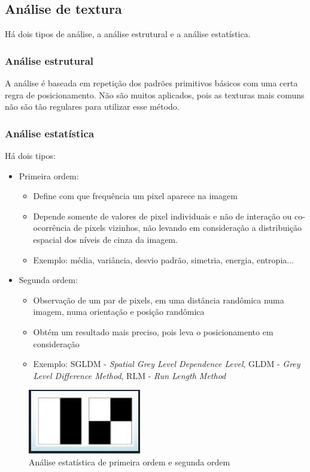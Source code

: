 \documentclass{article}
\begin{document}
\subsection{Análise de textura}
Há dois tipos de análise, a análise estrutural e a análise estatística.

\subsubsection{Análise estrutural}
A análise é baseada em repetição dos padrões primitivos básicos com uma certa regra de posicionamento.
Não são muitos aplicados, pois as texturas mais comuns não são tão regulares para utilizar esse método.

\subsubsection{Análise estatística}
Há dois tipos:
\begin{itemize}
    \item Primeira ordem:
    \begin{itemize}
        \item Define com que frequência um pixel aparece na imagem
        \item Depende somente de valores de pixel individuais e não de interação ou co-ocorrência de pixels vizinhos, não levando em consideração a distribuição espacial dos níveis de cinza da imagem.
        \item Exemplo: média, variância, desvio padrão, simetria, energia, entropia...
    \end{itemize}
    \item Segunda ordem:
    \begin{itemize}
        \item Observação de um par de pixels, em uma distância randômica numa imagem, numa orientação e posição randômica
        \item Obtém um resultado mais preciso, pois leva o posicionamento em consideração
        \item Exemplo: SGLDM - \textit{Spatial Grey Level Dependence Level}, GLDM - \textit{Grey Level Difference Method}, RLM - \textit{Run
        Length Method}
    \end{itemize}
\end{itemize}

\begin{figure}[!ht]
    \centering
    \includegraphics[scale=0.8]{Figure/figura5.PNG}
    \caption{Análise estatística de primeira ordem e segunda ordem}
    \label{fig:figura5}
\end{figure}
\end{document}
